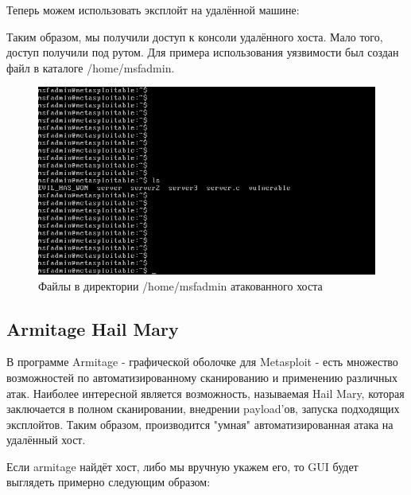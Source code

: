 \documentclass[a4paper]{article}
\begin{document}


Теперь можем использовать эксплойт на удалённой машине:



Таким образом, мы получили доступ к консоли удалённого хоста. Мало того, доступ получили под рутом. Для примера использования уязвимости был создан файл в каталоге /home/msfadmin.

\begin{figure}[H]
	\begin{center}
		\includegraphics[scale=0.5]{pics/evilhaswon.png}
		\caption{Файлы в директории /home/msfadmin атакованного хоста} 
		\label{pic:pic_name}
	\end{center}
\end{figure}

\subsection{Armitage Hail Mary}

В программе Armitage - графической оболочке для Metasploit - есть множество возможностей по автоматизированному сканированию и применению различных атак. Наиболее интересной является возможность, называемая Hail Mary, которая заключается в полном сканировании, внедрении payload'ов, запуска подходящих эксплойтов. Таким образом, производится "умная" автоматизированная атака на удалённый хост.


Если armitage найдёт хост, либо мы вручную укажем его, то GUI будет выглядеть примерно следующим образом:
\end{document}
